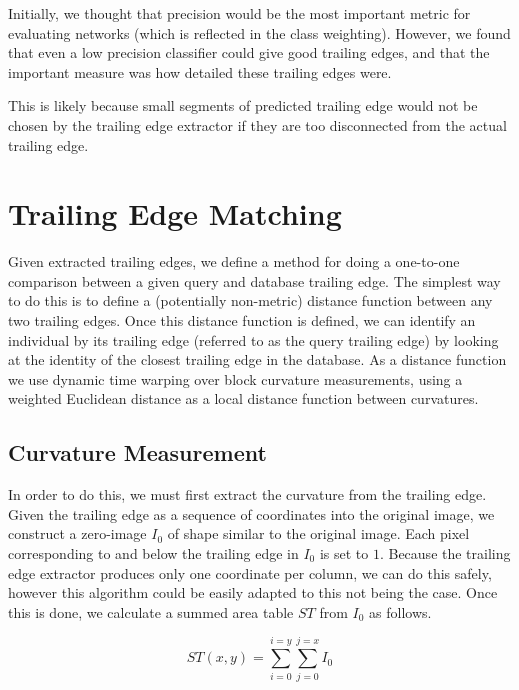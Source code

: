 Initially, we thought that precision would be the most important metric for evaluating networks (which is reflected in the class weighting).
However, we found that even a low precision classifier could give good trailing edges, and that the important measure was how detailed these trailing edges were.


This is likely because small segments of predicted trailing edge would not be chosen by the trailing edge extractor if they are too disconnected from the actual trailing edge.

\section{Trailing Edge Matching}

Given extracted trailing edges, we define a method for doing a one-to-one comparison between a given query and database trailing edge.
The simplest way to do this is to define a (potentially non-metric) distance function between any two trailing edges.
Once this distance function is defined, we can identify an individual by its trailing edge (referred to as the query trailing edge) by looking at the identity of the closest trailing edge in the database.
As a distance function we use dynamic time warping over block curvature measurements, using a weighted Euclidean distance as a local distance function between curvatures.

\subsection{Curvature Measurement}

In order to do this, we must first extract the curvature from the trailing edge.
Given the trailing edge as a sequence of coordinates into the original image, we construct a zero-image $I_0$ of shape similar to the original image.
Each pixel corresponding to and below the trailing edge in $I_0$ is set to $1$.
Because the trailing edge extractor produces only one coordinate per column, we can do this safely, however this algorithm could be easily adapted to this not being the case.
Once this is done, we calculate a summed area table \cite{crow1984summed} $ST$ from $I_0$ as follows.

\begin{equation} \label{eqn:sat}
ST(x,y) = \sum_{i=0}^{i=y}\sum_{j=0}^{j=x} I_0 
\end{equation}

